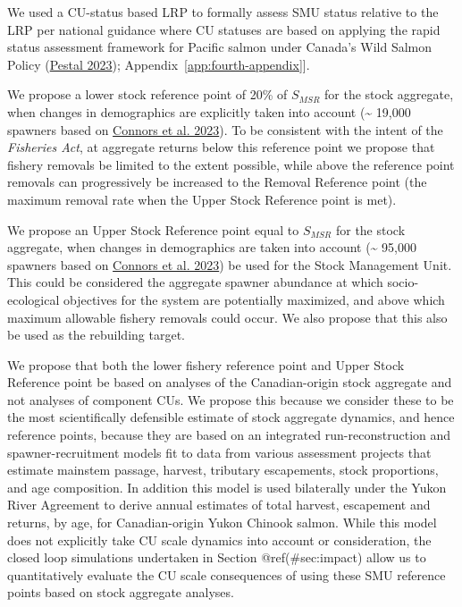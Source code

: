 \documentclass[11pt]{book}
\begin{document}
We used a CU-status based LRP to formally assess SMU status relative to the LRP per national guidance where CU statuses are based on applying the rapid status assessment framework for Pacific salmon under Canada's Wild Salmon Policy (\protect\hyperlink{ref-pestal2023state}{Pestal 2023}); Appendix~\ref{app:fourth-appendix}{]}.

We propose a lower stock reference point of 20\% of \(S_{MSR}\) for the stock aggregate, when changes in demographics are explicitly taken into account (\textasciitilde{} 19,000 spawners based on \protect\hyperlink{ref-connors_estimates_2023}{Connors et al. 2023}). To be consistent with the intent of the \emph{Fisheries Act}, at aggregate returns below this reference point we propose that fishery removals be limited to the extent possible, while above the reference point removals can progressively be increased to the Removal Reference point (the maximum removal rate when the Upper Stock Reference point is met).

We propose an Upper Stock Reference point equal to \(S_{MSR}\) for the stock aggregate, when changes in demographics are taken into account (\textasciitilde{} 95,000 spawners based on \protect\hyperlink{ref-connors_estimates_2023}{Connors et al. 2023}) be used for the Stock Management Unit. This could be considered the aggregate spawner abundance at which socio-ecological objectives for the system are potentially maximized, and above which maximum allowable fishery removals could occur. We also propose that this also be used as the rebuilding target.

We propose that both the lower fishery reference point and Upper Stock Reference point be based on analyses of the Canadian-origin stock aggregate and not analyses of component CUs. We propose this because we consider these to be the most scientifically defensible estimate of stock aggregate dynamics, and hence reference points, because they are based on an integrated run-reconstruction and spawner-recruitment models fit to data from various assessment projects that estimate mainstem passage, harvest, tributary escapements, stock proportions, and age composition. In addition this model is used bilaterally under the Yukon River Agreement to derive annual estimates of total harvest, escapement and returns, by age, for Canadian-origin Yukon Chinook salmon. While this model does not explicitly take CU scale dynamics into account or consideration, the closed loop simulations undertaken in Section @ref(\#sec:impact) allow us to quantitatively evaluate the CU scale consequences of using these SMU reference points based on stock aggregate analyses.
\end{document}
